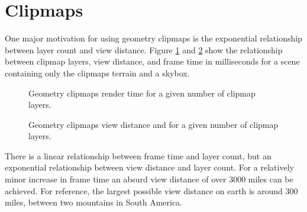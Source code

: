\section{Clipmaps}

One major motivation for using geometry clipmaps  is the exponential relationship between layer count and view distance.
Figure \ref{fig:clipmaps_plot_1} and \ref{fig:clipmaps_plot_2} show the relationship between clipmap layers, view distance, and frame time in milliseconds for a scene containing only the clipmaps terrain and a skybox.

\begin{figure}
	\centering
{}
	\caption{
		Geometry clipmaps render time for a given number of clipmap layers.
	}
	\label{fig:clipmaps_plot_1}
\end{figure}

\begin{figure}
	\centering
{}
	\caption{
		Geometry clipmaps view distance and for a given number of clipmap layers.
	}
	\label{fig:clipmaps_plot_2}
\end{figure}

There is a linear relationship between frame time and layer count, but an exponential relationship between view distance and layer count.
For a relatively minor increase in frame time an absurd view distance of over 3000 miles can be achieved.
For reference, the largest possible view distance on earth is around 300 miles, between two mountains in South America. \cite{viewdistancemaxearth}

